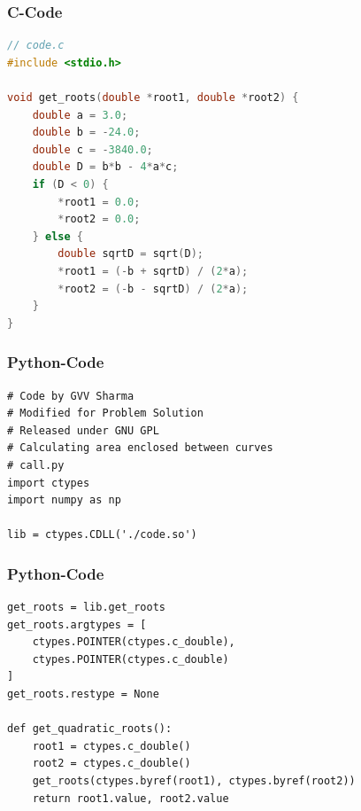 \documentclass{beamer}
\begin{document}
\begin{frame}[fragile]
\frametitle{C-Code}
\begin{lstlisting}[language=C]
// code.c
#include <stdio.h>

void get_roots(double *root1, double *root2) {
    double a = 3.0;
    double b = -24.0;
    double c = -3840.0;
    double D = b*b - 4*a*c;
    if (D < 0) {
        *root1 = 0.0;
        *root2 = 0.0;
    } else {
        double sqrtD = sqrt(D);
        *root1 = (-b + sqrtD) / (2*a);
        *root2 = (-b - sqrtD) / (2*a);
    }
}
\end{lstlisting}
\end{frame}
\begin{frame}[fragile]
\frametitle{Python-Code}
\begin{lstlisting}
# Code by GVV Sharma
# Modified for Problem Solution
# Released under GNU GPL
# Calculating area enclosed between curves
# call.py
import ctypes
import numpy as np

lib = ctypes.CDLL('./code.so')
\end{lstlisting}
\end{frame}
\begin{frame}[fragile]
\frametitle{Python-Code}
\begin{lstlisting}
get_roots = lib.get_roots
get_roots.argtypes = [
    ctypes.POINTER(ctypes.c_double),
    ctypes.POINTER(ctypes.c_double)
]
get_roots.restype = None

def get_quadratic_roots():
    root1 = ctypes.c_double()
    root2 = ctypes.c_double()
    get_roots(ctypes.byref(root1), ctypes.byref(root2))
    return root1.value, root2.value
\end{lstlisting}
\end{frame}
\end{document}
